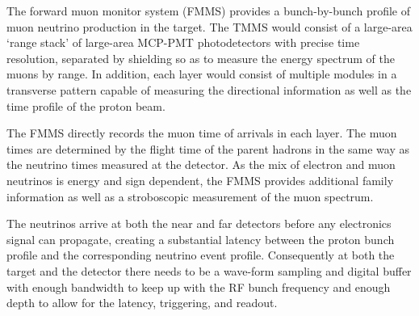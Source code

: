 The forward muon monitor system (FMMS) provides a
bunch-by-bunch profile of muon neutrino production in the target. The
TMMS would consist of a large-area `range stack' of large-area MCP-PMT
photodetectors with precise time resolution, separated by shielding so
as to measure the energy spectrum of the muons by range. In addition,
each layer would consist of multiple \LAPPDTM modules in a transverse
pattern capable of measuring the directional information as well
as the time profile of the proton beam.

The FMMS directly records the muon time of arrivals in each
layer. The muon times are determined by the flight time of the parent
hadrons in the same way as the neutrino times measured at the
detector. As the mix of electron and muon neutrinos is energy and sign
dependent, the FMMS provides additional family information as well as
a stroboscopic measurement of the muon spectrum.


%
% 
The neutrinos arrive at both the near and far detectors before any
electronics signal can propagate, creating a substantial latency
between the proton bunch profile and the corresponding neutrino event profile.
Consequently at both the target and the detector there needs to be a
wave-form sampling and digital buffer with enough bandwidth to keep up
with the RF bunch frequency and enough depth to allow for the latency,
triggering, and readout. 

